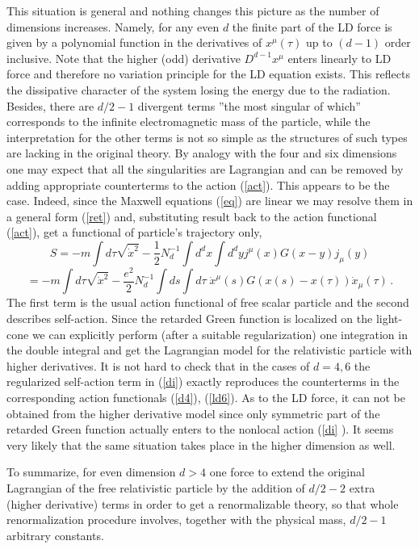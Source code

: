 \documentclass[a4paper,12pt]{article}
\begin{document}
This situation is general and nothing changes this picture as the number of
dimensions increases. Namely, for any even $d$ the finite part of the LD
force is given by a polynomial function in the derivatives of $x^\mu (\tau )$
up to $(d-1)$ order inclusive. Note that the higher (odd) derivative $%
D^{d-1}x^\mu $ enters linearly to LD force and therefore no variation
principle for the LD equation exists. This reflects the dissipative
character of the system losing the energy due to the radiation. Besides,
there are $d/2-1$ divergent terms ''the most singular of which'' corresponds
to the infinite electromagnetic mass of the particle, while the
interpretation for the other terms is not so simple as the structures of
such types are lacking in the original theory. By analogy with the four and
six dimensions one may expect that all the singularities are Lagrangian and
can be removed by adding appropriate counterterms to the action (\ref{act}).
This appears to be the case. Indeed, since the Maxwell equations (\ref{eq})
are linear we may resolve them in a general form (\ref{ret}) and,
substituting result back to the action functional (\ref{act}), get a
functional of particle's trajectory only,
\begin{equation}
S=-m\int d\tau \sqrt{\dot x^2}-\frac 12N_d^{-1}\int d^dx\int d^dyj^\mu
(x)G(x-y)j_\mu (y)  \label{di}
\end{equation}
\begin{equation*}
=-m\int d\tau \sqrt{\dot x^2}-\frac{e^2}2N_d^{-1}\int ds\int d\tau \;\dot
x^\mu (s)G(x(s)-x(\tau ))\dot x_\mu (\tau )\,.
\end{equation*}
The first term is the usual action functional of free scalar particle and
the second describes self-action. Since the retarded Green function is
localized on the light-cone we can explicitly perform (after a suitable
regularization) one integration in the double integral and get the
Lagrangian model for the relativistic particle with higher derivatives. It is
not hard to check that in the cases of $d=4,6$ the regularized self-action
term in (\ref{di}) exactly reproduces the counterterms in the corresponding
action functionals (\ref{d4}), (\ref{ld6}). As to the LD force, it can not
be obtained from the higher derivative model since only symmetric part of
the retarded Green function actually enters to the nonlocal action (\ref{di}%
). It seems very likely that the same situation takes place in the higher
dimension as well.

To summarize, for even dimension $d>4$ one force to extend the original
Lagrangian of the free relativistic particle by the addition of $d/2-2$
extra (higher derivative) terms in order to get a renormalizable theory, so
that whole renormalization procedure involves, together with the physical
mass, $d/2-1$ arbitrary constants.
\end{document}
